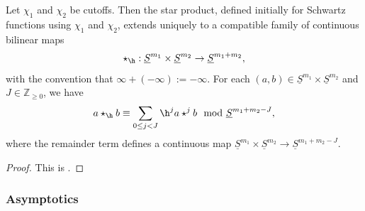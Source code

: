 \begin{theorem}\label{thm:extended-star-product}
  Let $\chi_1$ and $\chi_2$ be cutoffs.  Then the star product, defined initially for Schwartz functions using $\chi_1$ and $\chi_2$, extends uniquely to a compatible family of continuous bilinear maps
  \begin{equation*}
    \star_{\h} : \underline{S}^{m_1} \times \underline{S}^{m_2} \rightarrow \underline{S}^{m_1 + m_2},
  \end{equation*}
  with the convention that $\infty + (-\infty) := -\infty$.  For each $(a,b) \in \underline{S}^{m_1} \times \underline{S}^{m_2}$ and $J \in \mathbb{Z}_{\geq 0}$, we have
  \begin{equation*}
    a \star_{\h} b \equiv \sum_{0 \leq j < J} \h^j a \star^j b \mod{ \underline{S} ^{m_1 + m_2 - J} },
  \end{equation*}
  where the remainder term defines a continuous map $\underline{S} ^{m_1 } \times \underline{S} ^{m_2 } \rightarrow \underline{S} ^{m_1 + m_2 - J}$.
\end{theorem}
\begin{proof}
  This is \cite[Thm 1]{nelson-venkatesh-1}.
\end{proof}


\subsubsection{Asymptotics}\label{sec:star-prod-asymptotics}

